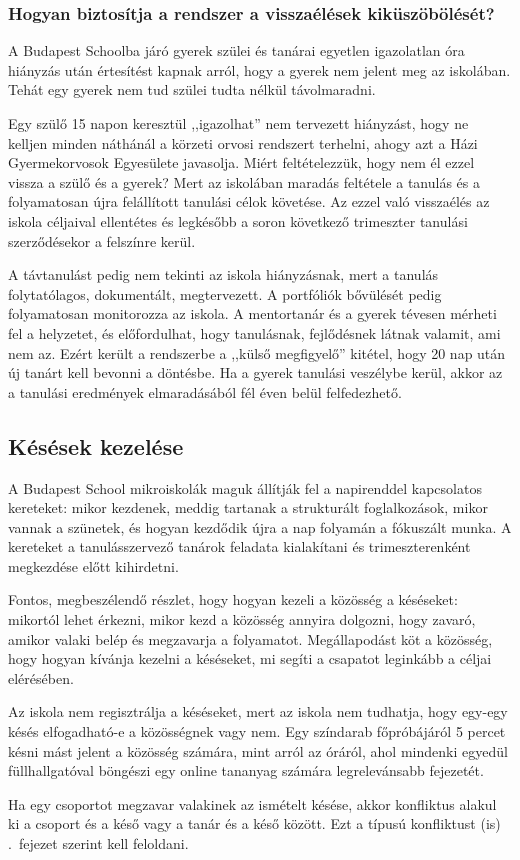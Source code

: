 \subsubsection{Hogyan biztosítja a rendszer a visszaélések kiküszöbölését?}
A Budapest Schoolba járó gyerek szülei és tanárai egyetlen igazolatlan óra hiányzás után értesítést kapnak arról, hogy a gyerek nem jelent meg az iskolában. Tehát egy gyerek nem tud szülei tudta nélkül távolmaradni.

Egy szülő 15 napon keresztül ,,igazolhat'' nem tervezett hiányzást, hogy ne kelljen minden náthánál a körzeti orvosi rendszert terhelni, ahogy azt a Házi Gyermekorvosok Egyesülete javasolja. Miért feltételezzük, hogy nem él ezzel vissza a szülő és a gyerek?  Mert az iskolában maradás feltétele a tanulás és a folyamatosan újra felállított tanulási célok követése. Az ezzel való visszaélés az iskola céljaival ellentétes és legkésőbb a soron következő trimeszter tanulási szerződésekor a felszínre kerül.

A távtanulást pedig nem tekinti az iskola hiányzásnak, mert a tanulás folytatólagos, dokumentált, megtervezett. A portfóliók bővülését pedig folyamatosan monitorozza az iskola. A mentortanár és a gyerek tévesen mérheti fel a helyzetet, és előfordulhat, hogy tanulásnak, fejlődésnek látnak valamit, ami nem az. Ezért került a rendszerbe a ,,külső megfigyelő'' kitétel, hogy 20 nap után új tanárt kell bevonni a döntésbe. Ha a gyerek tanulási veszélybe kerül, akkor az a tanulási eredmények elmaradásából fél éven belül felfedezhető.

\subsection{Késések kezelése}
A Budapest School mikroiskolák maguk állítják fel a napirenddel kapcsolatos kereteket: mikor kezdenek, meddig tartanak a strukturált foglalkozások, mikor vannak a szünetek, és hogyan kezdődik újra a nap folyamán a fóku\-szált munka. A kereteket a tanulásszervező tanárok feladata kialakítani és trimeszterenként megkezdése előtt kihirdetni.

Fontos, megbeszélendő részlet, hogy hogyan kezeli a közösség a késéseket: mikortól lehet érkezni, mikor kezd a közösség annyira dolgozni, hogy zavaró, amikor valaki belép és megzavarja a folyamatot. Megállapodást köt a közösség, hogy hogyan kívánja kezelni a késéseket, mi segíti a csapatot leginkább a céljai elérésében.

Az iskola nem regisztrálja a késéseket, mert az iskola nem tudhatja, hogy egy-egy késés elfogadható-e a közösségnek vagy nem. Egy színdarab főpróbájáról 5 percet késni mást jelent a közösség számára, mint arról az óráról, ahol mindenki egyedül füllhallgatóval böngészi egy online tananyag számára legrelevánsabb fejezetét.

Ha egy csoportot megzavar valakinek az ismételt késése, akkor konfliktus alakul ki a csoport és a késő vagy a tanár és a késő között. Ezt a típusú konfliktust (is) .~fejezet szerint kell feloldani.